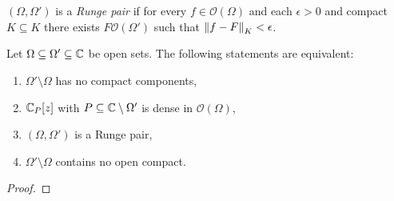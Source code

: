 \begin{definicija}
    $(\Omega, \Omega')$ is a \emph{Runge pair} if for every $f \in \mathcal{O}(\Omega)$ and each $\epsilon > 0$ and compact $K \subseteq K$ there exists $F \mathcal{O}(\Omega')$ such that $\left\lVert f - F\right\rVert_K < \epsilon$.
\end{definicija}

\begin{izrek}
    Let $\Omega \subseteq \Omega' \subseteq \mathbb{C}$ be open sets. The following statements are equivalent:
    \begin{enumerate}
        \item $\Omega' \setminus \Omega$ has no compact components,
        \item $\mathbb{C}_P[z]$ with $P \subseteq \mathbb{C} \setminus \Omega'$ is dense in $\mathcal{O}(\Omega)$,
        \item $(\Omega, \Omega')$ is a Runge pair,
        \item $\Omega' \setminus \Omega$ contains no open compact.
    \end{enumerate}
\end{izrek}
\begin{proof}
    
\end{proof}